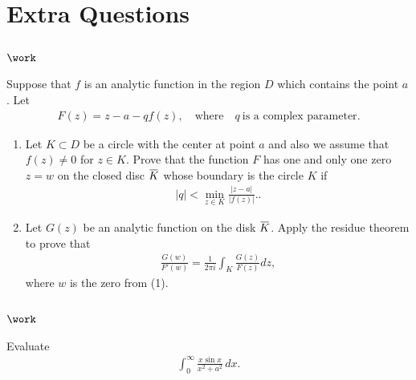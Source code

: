 \hypertarget{extra-questions}{%
\section{Extra Questions}\label{extra-questions}}

\hypertarget{work-61}{%
\subsection{\texorpdfstring{\(\work\)}{\textbackslash work}}\label{work-61}}

\begin{problem}[?]

Suppose that \(f\) is an analytic function in the region \(D\) which
contains the point \(a\). Let
\begin{align*}F(z)= z-a-qf(z),\quad \text{where}\quad q \ \text{is a complex
parameter}.\end{align*}

\begin{enumerate}
\def\labelenumi{\arabic{enumi}.}
\item
  Let \(K\subset D\) be a circle with the center at point \(a\) and also
  we assume that \(f(z)\not =0\) for \(z\in K\). Prove that the function
  \(F\) has one and only one zero \(z=w\) on the closed disc
  \(\mkern 1.5mu\overline{\mkern-1.5muK\mkern-1.5mu}\mkern 1.5mu\) whose
  boundary is the circle \(K\) if
  \begin{align*}
  \displaystyle{ |q|<\min_{z\in K} \frac{|z-a|}{|f(z)|}.}
  .\end{align*}
\item
  Let \(G(z)\) be an analytic function on the disk
  \(\mkern 1.5mu\overline{\mkern-1.5muK\mkern-1.5mu}\mkern 1.5mu\).
  Apply the residue theorem to prove that
  \begin{align*}
  \displaystyle{ \frac{G(w)}{F'(w)}=\frac{1}{2\pi i}\int_K \frac{G(z)}{F(z)} dz,}
  \end{align*}
  where \(w\) is the zero from (1).
\end{enumerate}

\end{problem}

\hypertarget{work-62}{%
\subsection{\texorpdfstring{\(\work\)}{\textbackslash work}}\label{work-62}}

\begin{problem}[?]

Evaluate
\begin{align*}
\displaystyle{ \int_{0}^{\infty}\frac{x\sin x}{x^2+a^2} \, dx }
.\end{align*}

\end{problem}

